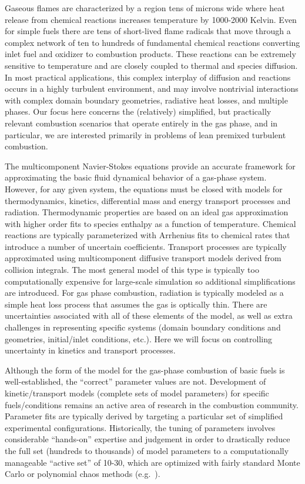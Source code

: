 \documentclass[11pt]{article}
\begin{document}
Gaseous flames are characterized by a region
tens of microns wide where heat release from chemical reactions
increases temperature by 1000-2000 Kelvin.
Even for simple fuels there
are
tens of short-lived flame radicals that move through a complex
network of ten to hundreds of fundamental chemical reactions
converting inlet fuel and oxidizer to combustion products.  
These reactions can be extremely sensitive to
temperature and are closely coupled to thermal and species diffusion.
In most
practical applications, this complex interplay of diffusion and
reactions occurs in a highly turbulent environment, and may involve
nontrivial interactions with complex domain boundary geometries,
radiative heat losses, and multiple phases.  Our focus here concerns
the (relatively) simplified, but practically relevant combustion
scenarios that operate entirely in the gas phase, and in particular,
we are interested primarily in problems of lean premixed turbulent combustion.

The multicomponent Navier-Stokes equations provide an accurate framework for approximating
the basic fluid dynamical behavior of a gas-phase system.
However, for any 
given system, the equations must be closed with models for
thermodynamics,
kinetics, differential mass and energy transport processes and radiation.
Thermodynamic properties are based on an ideal gas approximation with higher order fits
to species enthalpy as a function of temperature.
Chemical reactions are typically parameterized with
Arrhenius fits to chemical rates that introduce a number of uncertain
coefficients.
Transport processes are typically approximated using multicomponent diffusive
transport models derived from collision integrals.  The most general
model of this type is typically too computationally expensive for large-scale
simulation so additional simplifications are introduced.
For gas phase combustion, radiation is typically modeled as a simple heat loss
process that assumes the gas is optically thin.
There are uncertainties associated with all of these elements of the model,
as well as extra challenges in representing specific systems
(domain boundary conditions and geometries, initial\slash inlet
conditions, etc.).
Here we will focus on controlling uncertainty in kinetics and transport processes.

Although the form of the model for the gas-phase combustion of basic
fuels is well-established,
the ``correct'' parameter values are not.
Development of kinetic\slash transport models (complete sets of model parameters)
for specific fuels\slash conditions remains
an active area of research in the combustion community.
Parameter fits are typically derived by targeting
a particular set of
simplified experimental configurations.  Historically, the tuning of parameters
involves considerable ``hands-on'' expertise and judgement in
order to drastically reduce the full set (hundreds to thousands) of
model parameters to a computationally manageable ``active set'' of
10-30, which are optimized with fairly standard Monte Carlo or
polynomial chaos methods
(e.g.\ \cite{SheenWang2011,FrenklachWang1995,Davis2005,Qin2000}).
\end{document}
